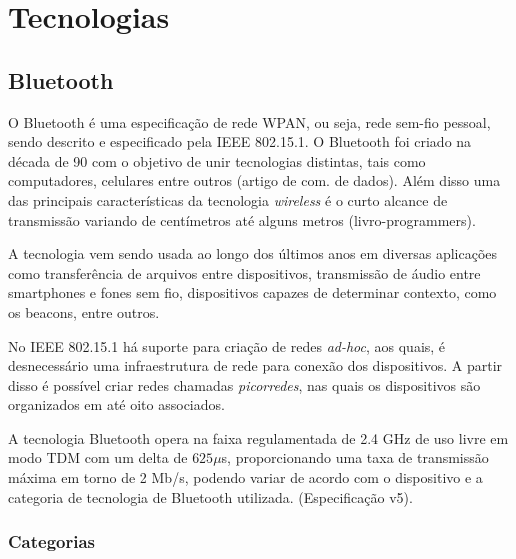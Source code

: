 \documentclass[
	article,			%
	11pt,				%
	oneside,			%
	a4paper,			%
	section=TITLE,		%
	subsection=TITLE,	%
	english,			%
	brazil,				%
	sumario=tradicional
	]{abntex2}
\begin{document}



\section{Tecnologias}

\subsection{Bluetooth}

O Bluetooth é uma especificação de rede WPAN, ou seja, rede sem-fio pessoal, sendo descrito e 
especificado pela IEEE 802.15.1. O Bluetooth foi criado na década de 90 com o objetivo de unir 
tecnologias distintas, tais como computadores, celulares entre outros (artigo de com. de dados). 
Além disso uma das principais características da tecnologia \textit{wireless} é o curto alcance de 
transmissão variando de centímetros até alguns metros (livro-programmers). 

A tecnologia vem sendo usada ao longo dos últimos anos em diversas aplicações como transferência de 
arquivos entre dispositivos, transmissão de áudio entre smartphones e fones sem fio, dispositivos 
capazes de determinar contexto, como os beacons, entre outros.

No IEEE 802.15.1 há suporte para criação de redes \textit{ad-hoc}, aos quais, é desnecessário uma 
infraestrutura de rede para conexão dos dispositivos. A partir disso é possível criar redes 
chamadas \textit{picorredes}, nas quais os dispositivos são organizados em até oito associados.

A tecnologia Bluetooth opera na faixa regulamentada de 2.4 GHz de uso livre em modo TDM com um 
delta de $625\mu$s, proporcionando uma taxa de transmissão máxima em torno de 2 Mb/s, podendo 
variar 
de acordo com o dispositivo e a categoria de tecnologia de Bluetooth utilizada. (Especificação v5).


\subsubsection{Categorias}
\end{document}
